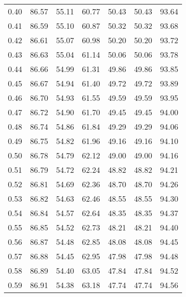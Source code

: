 \begin{tabular}{|c|c|c|c|c|c|c|}
      0.40 &     86.57 &     55.11 &      60.77 &   50.43 &      50.43 &         93.64 \\
      0.41 &     86.59 &     55.10 &      60.87 &   50.32 &      50.32 &         93.68 \\
      0.42 &     86.61 &     55.07 &      60.98 &   50.20 &      50.20 &         93.72 \\
      0.43 &     86.63 &     55.04 &      61.14 &   50.06 &      50.06 &         93.78 \\
      0.44 &     86.66 &     54.99 &      61.31 &   49.86 &      49.86 &         93.85 \\
      0.45 &     86.67 &     54.94 &      61.40 &   49.72 &      49.72 &         93.89 \\
      0.46 &     86.70 &     54.93 &      61.55 &   49.59 &      49.59 &         93.95 \\
      0.47 &     86.72 &     54.90 &      61.70 &   49.45 &      49.45 &         94.00 \\
      0.48 &     86.74 &     54.86 &      61.84 &   49.29 &      49.29 &         94.06 \\
      0.49 &     86.75 &     54.82 &      61.96 &   49.16 &      49.16 &         94.10 \\
      0.50 &     86.78 &     54.79 &      62.12 &   49.00 &      49.00 &         94.16 \\
      0.51 &     86.79 &     54.72 &      62.24 &   48.82 &      48.82 &         94.21 \\
      0.52 &     86.81 &     54.69 &      62.36 &   48.70 &      48.70 &         94.26 \\
      0.53 &     86.82 &     54.63 &      62.46 &   48.55 &      48.55 &         94.30 \\
      0.54 &     86.84 &     54.57 &      62.64 &   48.35 &      48.35 &         94.37 \\
      0.55 &     86.85 &     54.52 &      62.73 &   48.21 &      48.21 &         94.40 \\
      0.56 &     86.87 &     54.48 &      62.85 &   48.08 &      48.08 &         94.45 \\
      0.57 &     86.88 &     54.45 &      62.95 &   47.98 &      47.98 &         94.48 \\
      0.58 &     86.89 &     54.40 &      63.05 &   47.84 &      47.84 &         94.52 \\
      0.59 &     86.91 &     54.38 &      63.18 &   47.74 &      47.74 &         94.56 \\

\end{tabular}
